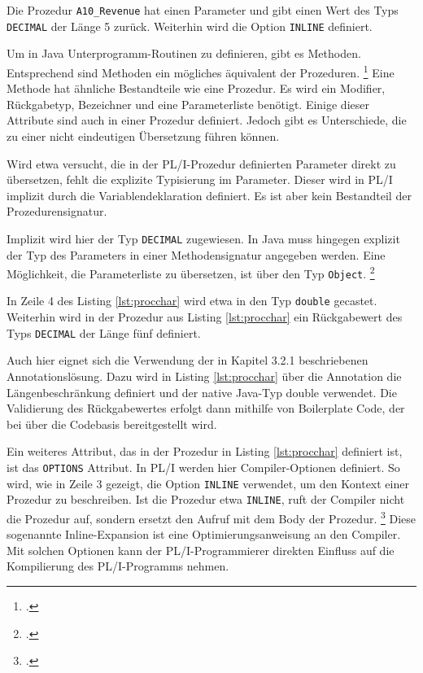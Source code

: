 Die Prozedur \verb+A10_Revenue+ hat einen Parameter und gibt einen Wert des Typs \verb+DECIMAL+ der L\"ange 5 zur\"uck.
Weiterhin wird die Option \verb+INLINE+ definiert.

Um in Java Unterprogramm-Routinen zu definieren, gibt es Methoden. 
Entsprechend sind Methoden ein mögliches äquivalent der Prozeduren. \footcite[Vgl. ][]{oracle}
Eine Methode hat ähnliche Bestandteile wie eine Prozedur.
Es wird ein Modifier, Rückgabetyp, Bezeichner und eine Parameterliste benötigt.
Einige dieser Attribute sind auch in einer Prozedur definiert.
Jedoch gibt es Unterschiede, die zu einer nicht eindeutigen Übersetzung führen können.

Wird etwa versucht, die in der PL/I-Prozedur definierten Parameter direkt zu übersetzen, fehlt die explizite Typisierung im Parameter. Dieser wird in PL/I implizit durch die Variablendeklaration definiert.
Es ist aber kein Bestandteil der Prozedurensignatur. 

Implizit wird hier der Typ \verb+DECIMAL+ zugewiesen. 
In Java muss hingegen explizit der Typ des Parameters in einer Methodensignatur angegeben werden.
Eine Möglichkeit, die Parameterliste zu übersetzen, ist über den Typ \verb+Object+. \footcite[Vgl. ][]{objectdocs}

In Zeile 4 des Listing \ref{lst:procchar} wird etwa in den Typ \verb+double+ gecastet. Weiterhin wird in der Prozedur aus Listing \ref{lst:procchar} ein Rückgabewert des Typs \verb+DECIMAL+ der L\"ange f\"unf definiert.

Auch hier eignet sich die Verwendung der in Kapitel 3.2.1 beschriebenen Annotationslösung. Dazu wird in Listing \ref{lst:procchar} über die Annotation die Längenbeschränkung definiert und der native Java-Typ double verwendet.
Die Validierung des Rückgabewertes erfolgt dann mithilfe von Boilerplate Code, der bei über die Codebasis bereitgestellt wird.

Ein weiteres Attribut, das in der Prozedur in Listing \ref{lst:procchar} definiert ist, ist das \verb+OPTIONS+
Attribut.
In PL/I werden hier Compiler-Optionen definiert. So wird, wie in Zeile 3 gezeigt, die Option \verb+INLINE+ verwendet, um den Kontext einer Prozedur zu beschreiben. Ist die Prozedur etwa \verb+INLINE+, ruft der Compiler nicht die Prozedur auf, sondern ersetzt den Aufruf mit dem Body der Prozedur. \footcite[Vgl.][]{optionsstmt} Diese sogenannte Inline-Expansion ist eine Optimierungsanweisung an den Compiler. Mit solchen Optionen kann der PL/I-Programmierer direkten Einfluss auf die Kompilierung des PL/I-Programms nehmen.

